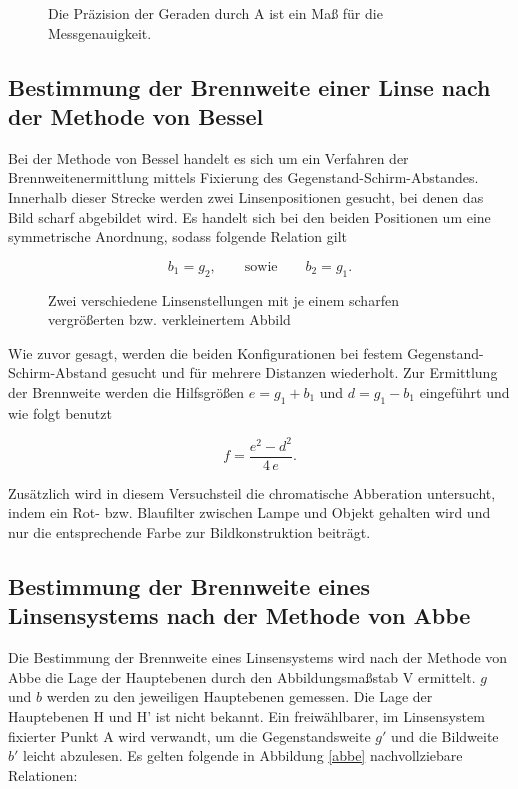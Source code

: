 \begin{figure}
 
 \caption{Die Präzision der Geraden durch A ist ein Maß für die Messgenauigkeit.}
\end{figure}

\subsection[Methode von Bessel]{Bestimmung der Brennweite einer Linse nach der Methode von Bessel}
Bei der Methode von Bessel handelt es sich um ein Verfahren der Brennweitenermittlung mittels Fixierung des Gegenstand-Schirm-Abstandes.
Innerhalb dieser Strecke werden zwei Linsenpositionen gesucht, bei denen das Bild scharf abgebildet wird. Es handelt sich bei den beiden
Positionen um eine symmetrische Anordnung, sodass folgende Relation gilt

\begin{equation}
 b_1 = g_2, \qquad \text{sowie} \qquad b_2 = g_1.
\end{equation}

\begin{figure}[H]
 
 \caption{Zwei verschiedene Linsenstellungen mit je einem scharfen vergrößerten bzw. verkleinertem Abbild}
\end{figure}

Wie zuvor gesagt, werden die beiden Konfigurationen bei festem Gegenstand-Schirm-Abstand gesucht und für mehrere Distanzen wiederholt.
Zur Ermittlung der Brennweite werden die Hilfsgrößen $e = g_1 + b_1$ und $d = g_1 - b_1$ eingeführt und wie folgt benutzt

\begin{equation}
 f = \frac{e^2-d^2}{4 \, e}.
 \label{Bessel}
\end{equation}

Zusätzlich wird in diesem Versuchsteil die chromatische Abberation untersucht, indem ein Rot- bzw. Blaufilter zwischen Lampe und Objekt
gehalten wird und nur die entsprechende Farbe zur Bildkonstruktion beiträgt. 

\subsection[Methode von Abbe]{Bestimmung der Brennweite eines Linsensystems nach der Methode von Abbe}
Die Bestimmung der Brennweite eines Linsensystems wird nach der Methode von Abbe die Lage der Hauptebenen durch den Abbildungsmaßstab V
ermittelt. $g$ und $b$ werden zu den jeweiligen Hauptebenen gemessen. Die Lage der Hauptebenen H und H' ist nicht bekannt. Ein freiwählbarer,
im Linsensystem fixierter Punkt A wird verwandt, um die Gegenstandsweite $g'$ und die Bildweite $b'$ leicht abzulesen. Es gelten folgende
in Abbildung \ref{abbe} nachvollziebare Relationen:

